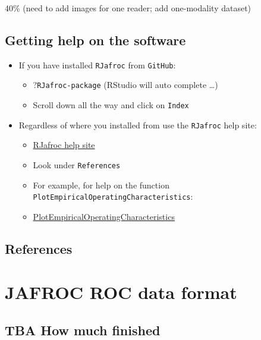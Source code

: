 \documentclass[
]{book}
\providecommand{\tightlist}{%
  \setlength{\itemsep}{0pt}\setlength{\parskip}{0pt}}
\begin{document}
40\% (need to add images for one reader; add one-modality dataset)

\hypertarget{quick-start-help-getting-help}{%
\section{Getting help on the software}\label{quick-start-help-getting-help}}

\begin{itemize}
\tightlist
\item
  If you have installed \texttt{RJafroc} from \texttt{GitHub}:

  \begin{itemize}
  \tightlist
  \item
    ?\texttt{RJafroc-package} (RStudio will auto complete \ldots)
  \item
    Scroll down all the way and click on \texttt{Index}
  \end{itemize}
\item
  Regardless of where you installed from use the \texttt{RJafroc} help site:

  \begin{itemize}
  \tightlist
  \item
    \href{https://dpc10ster.github.io/RJafroc/}{RJafroc help site}
  \item
    Look under \texttt{References}
  \item
    For example, for help on the function \texttt{PlotEmpiricalOperatingCharacteristics}:
  \item
    \href{https://dpc10ster.github.io/RJafroc/reference/PlotEmpiricalOperatingCharacteristics.html}{PlotEmpiricalOperatingCharacteristics}
  \end{itemize}
\end{itemize}

\hypertarget{quick-start-help-references}{%
\section{References}\label{quick-start-help-references}}

\hypertarget{quick-start-data-format}{%
\chapter{JAFROC ROC data format}\label{quick-start-data-format}}

\hypertarget{quick-start-data-format-how-much-finished}{%
\section{TBA How much finished}\label{quick-start-data-format-how-much-finished}}
\end{document}

